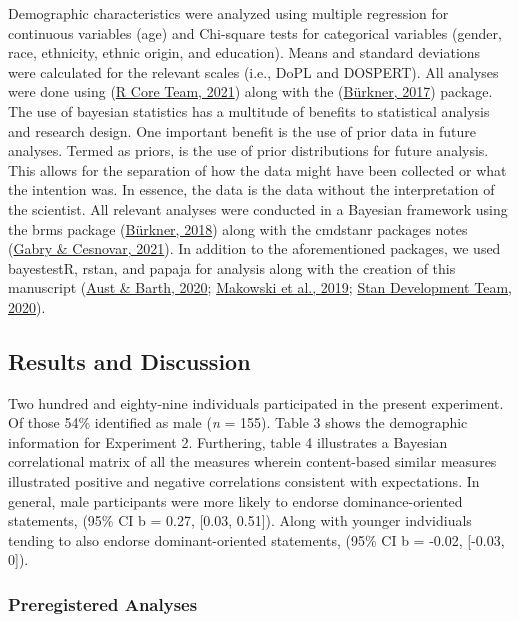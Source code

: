 \documentclass[
  donotrepeattitle,doc, 12pt, a4paper,floatsintext]{apa7}
\begin{document}
Demographic characteristics were analyzed using multiple regression for continuous variables (age) and Chi-square tests for categorical variables (gender, race, ethnicity, ethnic origin, and education). Means and standard deviations were calculated for the relevant scales (i.e., DoPL and DOSPERT). All analyses were done using (\protect\hyperlink{ref-rcoreteam2021}{R Core Team, 2021}) along with the (\protect\hyperlink{ref-burkner2017}{Bürkner, 2017}) package.
The use of bayesian statistics has a multitude of benefits to statistical analysis and research design. One important benefit is the use of prior data in future analyses. Termed as priors, is the use of prior distributions for future analysis. This allows for the separation of how the data might have been collected or what the intention was. In essence, the data is the data without the interpretation of the scientist.
All relevant analyses were conducted in a Bayesian framework using the brms package (\protect\hyperlink{ref-burkner2018}{Bürkner, 2018}) along with the cmdstanr packages notes (\protect\hyperlink{ref-gabry2021}{Gabry \& Cesnovar, 2021}). In addition to the aforementioned packages, we used bayestestR, rstan, and papaja for analysis along with the creation of this manuscript (\protect\hyperlink{ref-aust2020}{Aust \& Barth, 2020}; \protect\hyperlink{ref-makowski2019}{Makowski et al., 2019}; \protect\hyperlink{ref-standevelopmentteam2020}{Stan Development Team, 2020}).
\hypertarget{results-and-discussion}{%
\subsection{Results and Discussion}\label{results-and-discussion}}
Two hundred and eighty-nine individuals participated in the present experiment. Of those 54\% identified as male (\emph{n} = 155). Table 3 shows the demographic information for Experiment 2. Furthering, table 4 illustrates a Bayesian correlational matrix of all the measures wherein content-based similar measures illustrated positive and negative correlations consistent with expectations.
In general, male participants were more likely to endorse dominance-oriented statements, (95\% CI b = 0.27, {[}0.03, 0.51{]}). Along with younger indvidiuals tending to also endorse dominant-oriented statements, (95\% CI b = -0.02, {[}-0.03, 0{]}).
\hypertarget{preregistered-analyses-1}{%
\subsubsection{Preregistered Analyses}\label{preregistered-analyses-1}}
\end{document}

